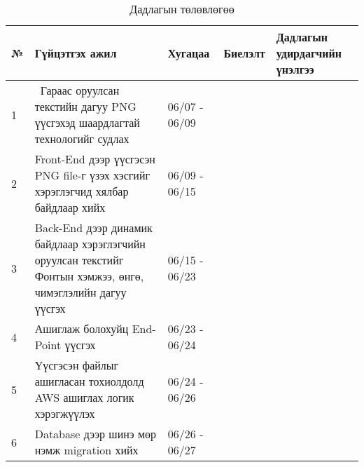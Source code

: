 \begin{table}[h]
	\caption{Дадлагын төлөвлөгөө}
	\begin{tabular}{|p{0.5cm}|p{8cm}|l|l|p{3cm}|}
	\hline
	\textbf{№} & \textbf{Гүйцэтгэх ажил} & \textbf{Хугацаа} & \textbf{Биелэлт} & \textbf{Дадлагын удирдагчийн үнэлгээ} \\ \hline
	1 &  Гараас оруулсан текстийн дагуу PNG үүсгэхэд шаардлагтай технологийг судлах & 06/07 - 06/09 && \\ \hline
	2 & Front-End дээр үүсгэсэн PNG file-г үзэх хэсгийг хэрэглэгчид хялбар байдлаар хийх & 06/09 - 06/15 && \\ \hline
	3 & Back-End дээр динамик байдлаар хэрэглэгчийн оруулсан текстийг Фонтын хэмжээ, өнгө, чимэглэлийн дагуу үүсгэх & 06/15 - 06/23 && \\ \hline
	4 & Ашиглаж болохуйц End-Point үүсгэх & 06/23 - 06/24 && \\ \hline
	5 & Үүсгэсэн файлыг ашигласан тохиолдолд AWS ашиглах логик хэрэгжүүлэх & 06/24 - 06/26 && \\ \hline
	6 & Database дээр шинэ мөр нэмж migration хийх & 06/26 - 06/27 && \\ \hline

	\end{tabular}
	\end{table}